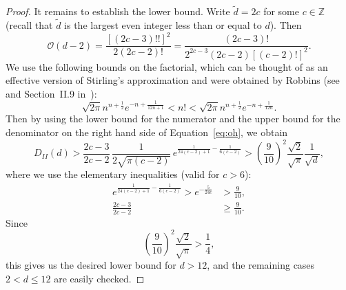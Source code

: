 \documentclass[11pt]{article}
\theoremstyle{plain}
\theoremstyle{definition}
\theoremstyle{remark}
\numberwithin{equation}{section}
\newcommand{\ZZ}{\mathbb{Z}}
\begin{document}
\begin{proof}
  It remains to establish the lower bound.  Write $\tilde{d}=2c$ for some
  $c\in\ZZ$ (recall that $\tilde{d}$ is the largest even integer less than or
  equal to $d$).
  Then
  \begin{equation}\label{eq:oh}
    \mathscr{O}(d-2)=\frac{[(2c-3)!!]^2}{2(2c-2)!}=\frac{(2c-3)!}{2^{2c-3}(2c-2)[(c-2)!]^2}.
  \end{equation}
  We use the following bounds on the factorial, which can be thought of as an
  effective version of Stirling's approximation and were obtained by Robbins
  (see~\cite{Robbins} and Section~II.9 in~\cite{Feller}):
  \begin{equation*}
    \sqrt{2\pi}n^{n+\frac{1}{2}}e^{-n+\frac{1}{12n+1}}<n!<\sqrt{2\pi}n^{n+\frac{1}{2}}e^{-n+\frac{1}{12n}}.
  \end{equation*}
  Then by using the lower bound for the numerator and the upper bound for the
  denominator on the right hand side of Equation~\eqref{eq:oh},
  we obtain
  \begin{equation*}
    D_{II}(d)>\frac{2c-3}{2c-2}\,\frac{1}{2\sqrt{\pi(c-2)}}\,
    e^{\frac{1}{24(c-2)+1}-\frac{1}{6(c-2)}}
    >\left(\frac{9}{10}\right)^2\frac{\sqrt{2}}{\sqrt{\pi}}\frac{1}{\sqrt{d}},
  \end{equation*}
  where we use the elementary inequalities (valid for $c>6$):
  \begin{align*}
    e^{\frac{1}{24(c-2)+1}-\frac{1}{6(c-2)}}>e^{-\frac{5}{24c}}&>\frac{9}{10},\\
    \frac{2c-3}{2c-2}&\geq \frac{9}{10}.
  \end{align*}
  Since
  \begin{equation*}
    \left(\frac{9}{10}\right)^2\frac{\sqrt{2}}{\sqrt{\pi}}>\frac{1}{4},
  \end{equation*} 
  this gives us the desired lower bound for $d>12$, and the remaining
  cases $2<d\leq 12$ are easily checked.
\end{proof}
\end{document}
